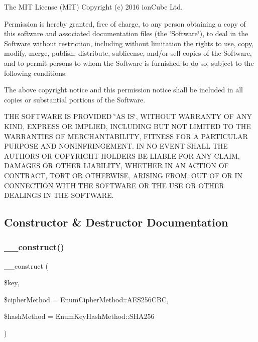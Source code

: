The M\+IT License (M\+IT) Copyright (c) 2016 ion\+Cube Ltd.

Permission is hereby granted, free of charge, to any person obtaining a copy of this software and associated documentation files (the \char`\"{}\+Software\char`\"{}), to deal in the Software without restriction, including without limitation the rights to use, copy, modify, merge, publish, distribute, sublicense, and/or sell copies of the Software, and to permit persons to whom the Software is furnished to do so, subject to the following conditions\+:

The above copyright notice and this permission notice shall be included in all copies or substantial portions of the Software.

T\+HE S\+O\+F\+T\+W\+A\+RE IS P\+R\+O\+V\+I\+D\+ED \char`\"{}\+A\+S I\+S\char`\"{}, W\+I\+T\+H\+O\+UT W\+A\+R\+R\+A\+N\+TY OF A\+NY K\+I\+ND, E\+X\+P\+R\+E\+SS OR I\+M\+P\+L\+I\+ED, I\+N\+C\+L\+U\+D\+I\+NG B\+UT N\+OT L\+I\+M\+I\+T\+ED TO T\+HE W\+A\+R\+R\+A\+N\+T\+I\+ES OF M\+E\+R\+C\+H\+A\+N\+T\+A\+B\+I\+L\+I\+TY, F\+I\+T\+N\+E\+SS F\+OR A P\+A\+R\+T\+I\+C\+U\+L\+AR P\+U\+R\+P\+O\+SE A\+ND N\+O\+N\+I\+N\+F\+R\+I\+N\+G\+E\+M\+E\+NT. IN NO E\+V\+E\+NT S\+H\+A\+LL T\+HE A\+U\+T\+H\+O\+RS OR C\+O\+P\+Y\+R\+I\+G\+HT H\+O\+L\+D\+E\+RS BE L\+I\+A\+B\+LE F\+OR A\+NY C\+L\+A\+IM, D\+A\+M\+A\+G\+ES OR O\+T\+H\+ER L\+I\+A\+B\+I\+L\+I\+TY, W\+H\+E\+T\+H\+ER IN AN A\+C\+T\+I\+ON OF C\+O\+N\+T\+R\+A\+CT, T\+O\+RT OR O\+T\+H\+E\+R\+W\+I\+SE, A\+R\+I\+S\+I\+NG F\+R\+OM, O\+UT OF OR IN C\+O\+N\+N\+E\+C\+T\+I\+ON W\+I\+TH T\+HE S\+O\+F\+T\+W\+A\+RE OR T\+HE U\+SE OR O\+T\+H\+ER D\+E\+A\+L\+I\+N\+GS IN T\+HE S\+O\+F\+T\+W\+A\+RE. 

\subsection{Constructor \& Destructor Documentation}
\mbox{\label{class_pes_1_1_security_1_1_cryptor_1_1_cryptor_open_s_s_l_base_a77c2a2122cb5b976d6e40c704ea4b3b4}} 
\subsubsection{\texorpdfstring{\+\_\+\+\_\+construct()}{\_\_construct()}}
{\footnotesize\ttfamily \+\_\+\+\_\+construct (\begin{DoxyParamCaption}\item[{}]{\$key,  }\item[{}]{\$cipher\+Method = {\ttfamily EnumCipherMethod\+:\+:AES256CBC},  }\item[{}]{\$hash\+Method = {\ttfamily EnumKeyHashMethod\+:\+:SHA256} }\end{DoxyParamCaption})}

